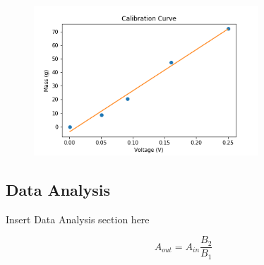 \documentclass[11pt]{article}
\begin{document}
\begin{figure} [!ht]
	\centering
	
	\includegraphics[width=0.75\textwidth]{../img/calibration.png}
	
	\caption{}
	
	\label{fig:cal_graph}
\end{figure}

\subsection{Data Analysis}
Insert Data Analysis section here

\begin{equation}\label{eq:random}
    A_{out} = A_{in}\frac{B_2}{B_1}
\end{equation}
\end{document}
